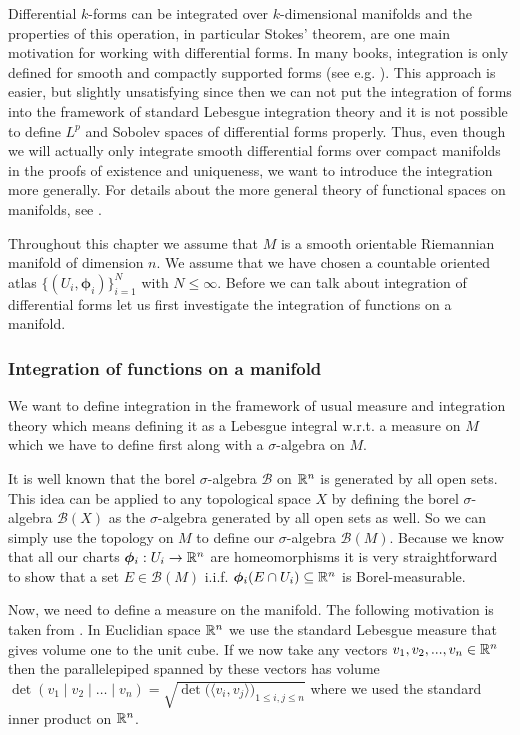 \documentclass[../main.tex]{subfiles}
\begin{document}
Differential $k$-forms can be integrated over $k$-dimensional manifolds and 
the properties of this operation, in particular Stokes' theorem, are one main motivation for working with differential 
forms. In many books, integration is only defined for 
smooth and compactly supported forms (see e.g. \cite[Sec.\,V.3]{topology_and_geometry}). This approach is easier, 
but slightly unsatisfying since then we can not put the integration of forms 
into the framework of standard Lebesgue integration theory and it is not possible 
to define $L^p$ and Sobolev spaces of differential forms properly. Thus, even though we will
actually only integrate smooth differential forms over compact manifolds in the proofs
of existence and uniqueness,
we want to introduce the integration more generally. For details about the 
more general theory of functional spaces on manifolds, see \cite[Sec.\,10.2.4]{nicolaescu}.

Throughout this chapter we assume that $M$ is a smooth orientable Riemannian 
manifold of dimension $n$. We assume that we have chosen a 
countable oriented atlas $\{ (U_i, \boldsymbol{\phi}_i) \}_{i=1}^N$ with $N \leq \infty$. 
Before we can talk about integration of differential forms let us first 
investigate the integration of functions on a manifold.

\subsubsection{Integration of functions on a manifold}

We want to define integration in the framework of usual measure and integration
theory which means defining it as a Lebesgue integral w.r.t. a measure on $M$
which we have to define first along with a $\sigma$-algebra on $M$. 

It is well known that
the borel $\sigma$-algebra $\mathcal{B}$ on $\mathbb{R}^n$ is generated
by all open sets. This idea can be applied to any topological space $X$ by 
defining the borel $\sigma$-algebra $\mathcal{B}(X)$ as the $\sigma$-algebra 
generated by all open sets as well. So we can simply use the topology on $M$ to define 
our $\sigma$-algebra $\mathcal{B}(M)$. Because we know that all our 
charts $\boldsymbol{\phi}_i: U_i \rightarrow \mathbb{R}^n$ are homeomorphisms it is very 
straightforward to show that a set $E \in \mathcal{B}(M)$ i.i.f.
$\boldsymbol{\phi}_i(E \cap U_i) \subseteq \mathbb{R}^n$ is Borel-measurable. 

Now, we need to define a measure on the manifold. 
The following motivation is taken from \cite[3.H.2]{gallot_hulin_lafontaine}.
In Euclidian space $\mathbb{R}^n$ we use the standard Lebesgue measure that gives 
volume one to the unit cube. If we now take any vectors $v_1, v_2, ..., v_n 
\in \mathbb{R}^n$ then the parallelepiped spanned by these vectors has 
volume $\det (v_1 \mid v_2 \mid \dots \mid v_n) 
= \sqrt{ \det \big( \langle v_i , v_j \rangle \big)_{1\leq i,j \leq n} }$ where 
we used the standard inner product on $\mathbb{R}^n$. 
\end{document}

